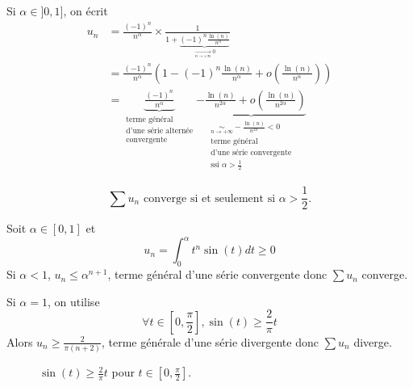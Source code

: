 \begin{solution}
\begin{enumerate}
		Si $\alpha\in]0,1]$, on écrit 
		\begin{align*}
			u_{n}
			&=\frac{(-1)^{n}}{n^{\alpha}}\times\frac{1}{1+\underbrace{(-1)^{n}\frac{\ln(n)}{n^{\alpha}}}_{\xrightarrow[n\to+\infty]{}0}}\\
			&=\frac{(-1)^{n}}{n^{\alpha}}\left(1-(-1)^{n}\frac{\ln(n)}{n^{\alpha}}+o\left(\frac{\ln(n)}{n^{\alpha}}\right)\right)\\
			&=\underbrace{\frac{(-1)^{n}}{n^{\alpha}}}_{\substack{\text{terme général}\\\text{d'une série alternée}\\\text{convergente}}}\underbrace{-\frac{\ln(n)}{n^{2\alpha}}+o\left(\frac{\ln(n)}{n^{2\alpha}}\right)}_{\substack{\underset{n\to+\infty}{\sim}-\frac{\ln(n)}{n^{2\alpha}}<0\\\text{terme général}\\\text{d'une série convergente}\\\text{ssi }\alpha>\frac{1}{2}}}
		\end{align*}

		$$\boxed{\sum u_{n}\text{ converge si et seulement si }\alpha>\frac{1}{2}\text{.}}$$
	\end{enumerate}
\end{solution}

\begin{remark}
	Soit $\alpha\in[0,1]$ et 
	$$u_{n}=\int_{0}^{\alpha}t^{n}\sin(t)dt\geqslant0$$
	Si $\alpha<1$, $u_{n}\leqslant\alpha^{n+1}$, terme général d'une série convergente donc $\sum u_{n}$ converge.

	Si $\alpha=1$, on utilise
	$$\forall t\in\left[0,\frac{\pi}{2}\right],\sin(t)\geqslant\frac{2}{\pi}t$$
	Alors $u_{n}\geqslant\frac{2}{\pi (n+2)}$, terme générale d'une série divergente donc $\sum u_{n}$ diverge.
\end{remark}

\begin{figure}
	\centering
	\caption{$\sin(t)\geqslant\frac{2}{\pi}t$ pour $t\in\left[0,\frac{\pi}{2}\right]$.}
\end{figure}

